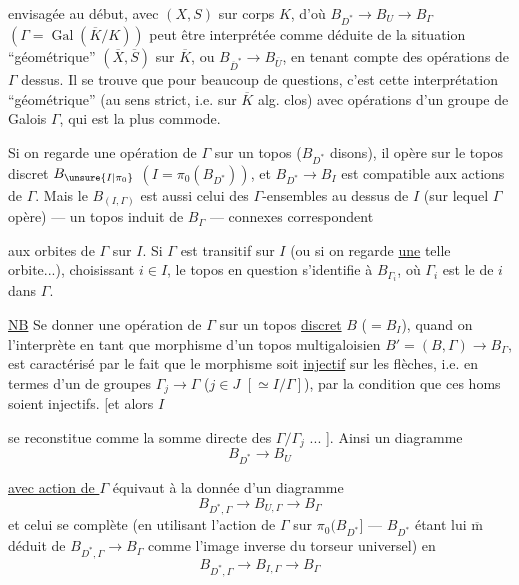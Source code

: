  envisagée au début, avec $(X,S)$ sur corps $K$,
d'où  $B_{D^*}\longrightarrow B_U\longrightarrow B_\Gamma$
$(\Gamma=\operatorname{Gal}(\overline K/K))$
peut être interprétée comme déduite
de la situation ``géométrique'' $(\overline X,\overline S)$ sur $\overline K$,
ou $B_{\overline D^*}\longrightarrow B_{\overline U}$, en tenant compte
des opérations de $\Gamma$ dessus. Il se trouve
que pour beaucoup de questions, c'est
cette interprétation ``géométrique'' (au
sens strict, i.e. sur $\overline K$ alg. clos) avec
opérations d'un groupe de Galois $\Gamma$, qui
est la plus commode.

Si on regarde une opération de $\Gamma$
sur un topos ($B_{D^*}$ disons),
il opère sur le topos discret $B_{\unsure{I|\pi_0}}$
$(I=\pi_0(B_{D^*}))$, et $B_{D^*}\longrightarrow B_I$ est
compatible aux actions de $\Gamma$. 
Mais le   $B_{(I,\Gamma)}$ est aussi
celui des $\Gamma$-ensembles au dessus de
$I$ (sur lequel $\Gamma$ opère) --- un topos induit
de $B_\Gamma$ ---  
connexes correspondent

aux orbites de $\Gamma$ sur $I$. Si $\Gamma$ est
transitif sur $I$  (ou si on regarde \uline{une}
telle orbite...), choisissant $i\in I$, le topos
en question s'identifie à $B_{\Gamma_i}$, où $\Gamma_i$
est le  de  $i$ dans $\Gamma$.

\uline{NB} Se donner une opération de $\Gamma$
sur un topos \uline{discret} $B$ ($=B_I$),
quand on l'interprète en tant
que morphisme d'un topos
multigaloisien $B'=(B,\Gamma)\longrightarrow B_\Gamma$,
est caractérisé par le fait que
le morphisme 
soit \uline{injectif} sur les
flèches, i.e. en termes d'un 
 de groupes $\Gamma_j\longrightarrow\Gamma$ ($j\in J$
$[\simeq I/\Gamma]$), par la condition que ces
homs soient injectifs. [et alors $I$

se reconstitue comme la somme
directe des $\Gamma/\Gamma_j$ ... ]. Ainsi un
diagramme
\[
 B_{D^*}\longrightarrow B_U
\]

\uline{avec action de $\Gamma$} équivaut à la donnée
d'un diagramme
\[
 B_{D^*,\Gamma}\longrightarrow B_{U,\Gamma}\longrightarrow B_\Gamma
\]
et celui se complète (en utilisant
l'action de $\Gamma$ sur $\pi_0(B_{D^*}]$ ---
$B_{D^*}$ étant lui $\overline{\mathrm m}$ déduit de $B_{D^*,\Gamma}\longrightarrow B_\Gamma$
comme l'image inverse du torseur
universel)  en
\[
 B_{D^*,\Gamma}\longrightarrow B_{I,\Gamma}\longrightarrow B_\Gamma
\]

